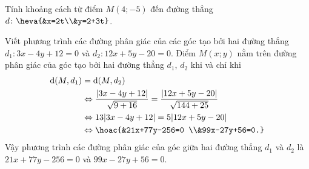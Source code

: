 \begin{bt}%
	Tính khoảng cách từ điểm $M(4;-5)$ đến đường thẳng $d\colon \heva{&x=2t\\&y=2+3t}$.
\end{bt}
\begin{bt}%
	Viết phương trình các đường phân giác của các góc tạo bởi hai đường thẳng $d_1\colon 3x-4y+12=0$ và $d_2\colon 12x+5y-20=0$.
	\loigiai
	{Điểm $M(x;y)$ nằm trên đường phân giác của góc tạo bởi hai đường thẳng $d_1$, $d_2$ khi và chỉ khi
		\begin{align*}
			\mathrm{d}(M,d_1)&=\mathrm{d}(M,d_2)\\
			&\Leftrightarrow \dfrac{|3x-4y+12|}{\sqrt{9+16}}=\dfrac{|12x+5y-20|}{\sqrt{144+25}}\\
			&\Leftrightarrow 13|3x-4y+12|=5|12x+5y-20|\\
			&\Leftrightarrow \hoac{&21x+77y-256=0 \\&99x-27y+56=0.}
		\end{align*}
		Vậy phương trình các đường phân giác của góc giữa hai đường thẳng $d_1$ và $d_2$ là $21x+77y-256=0$ và $99x-27y+56=0$.}
\end{bt}
